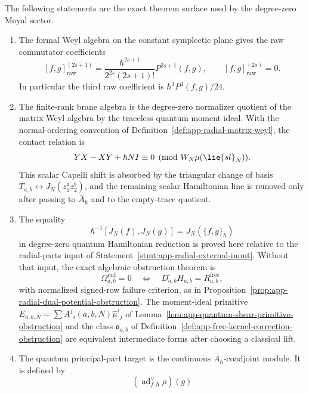 \begin{prop}
\label{prop:app-moyal-capelli-realization-boundary}
  The following statements are the exact theorem surface used by the
  degree-zero Moyal sector.
  \begin{enumerate}
    \item The formal Weyl algebra on the constant symplectic plane gives
      the raw commutator coefficients
      \[
        [f,g]_{\mathrm{raw}}^{(2s+1)}
        =
        \frac{\hbar^{2s+1}}{2^{2s}(2s+1)!}P^{2s+1}(f,g),
        \qquad
        [f,g]_{\mathrm{raw}}^{(2s)}=0.
      \]
      In particular the third raw coefficient is
      \(\hbar^3P^3(f,g)/24\).
    \item The finite-rank brane algebra is the degree-zero normalizer
      quotient of the matrix Weyl algebra by the traceless quantum
      moment ideal.  With the normal-ordering convention of
      Definition~\ref{def:app-radial-matrix-weyl}, the contact relation
      is
      \[
        YX-XY+\hbar N I\equiv0
        \pmod{\mathcal W_N\widehat\mu(\lie{sl}_N)}.
      \]
      This scalar Capelli shift is absorbed by the triangular change of
      basis \(T_{a,b}\leftrightarrow J_N(z_1^az_2^b)\), and the remaining
      scalar Hamiltonian line is removed only after passing to
      \(\bar A_\hbar\) and to the empty-trace quotient.
    \item The equality
      \[
        \hbar^{-1}[J_N(f),J_N(g)]
        =
        J_N(\{f,g\}_\hbar)
      \]
      in degree-zero quantum Hamiltonian reduction is proved here
      relative to the radial-parts input of
      Statement~\ref{stmt:app-radial-external-input}.  Without that input,
      the exact algebraic obstruction theorem is
      \[
        \Omega^{\mathrm{rad}}_{a,b}=0
        \quad\Longleftrightarrow\quad
        D^\square_{a,b}H_{a,b}=R^{\mathrm{free}}_{a,b},
      \]
      with normalized signed-row failure criterion, as in
      Proposition~\ref{prop:app-radial-dual-potential-obstruction}.  The
      moment-ideal primitive
      \(E_{a,b,N}=\sum A^j{}_i(a,b,N)\widehat\mu^i{}_j\) of
      Lemma~\ref{lem:app-quantum-shear-primitive-obstruction} and the
      class \(\mathfrak o_{a,b}\) of
      Definition~\ref{def:app-free-kernel-correction-obstruction} are
      equivalent intermediate forms after choosing a classical lift.
    \item The quantum principal-part target is the continuous
      \(\bar A_\hbar\)-coadjoint module.  It is defined by
      \[
        (\operatorname{ad}^{\vee}_{f,\hbar}\rho)(g)
\]
\end{enumerate}
\end{prop}
